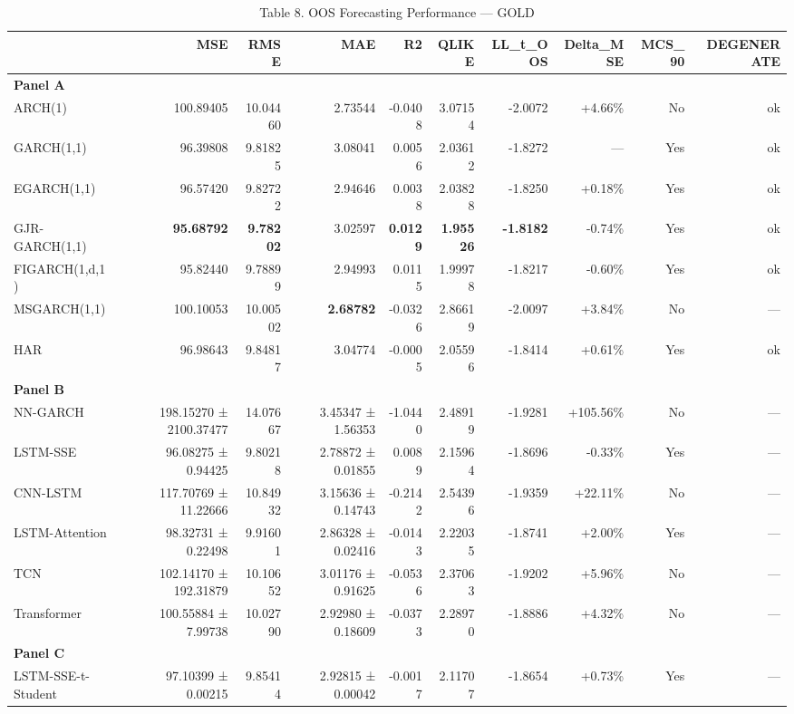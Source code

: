 \begin{table}[ht]
\centering
\caption{Table 8. OOS Forecasting Performance — GOLD}
\label{tab:oos_gold}
\begin{tabular}{lrrrrrrrrr}
\toprule
 & MSE & RMSE & MAE & R2 & QLIKE & LL_t_OOS & Delta_MSE & MCS_90 & DEGENERATE \\
\midrule
\multicolumn{10}{l}{\textbf{Panel A}} \\
ARCH(1) & 100.89405 & 10.04460 & 2.73544 & -0.0408 & 3.07154 & -2.0072 & +4.66\% & No & ok \\
GARCH(1,1) & 96.39808 & 9.81825 & 3.08041 & 0.0056 & 2.03612 & -1.8272 & — & Yes & ok \\
EGARCH(1,1) & 96.57420 & 9.82722 & 2.94646 & 0.0038 & 2.03828 & -1.8250 & +0.18\% & Yes & ok \\
GJR-GARCH(1,1) & \textbf{95.68792} & \textbf{9.78202} & 3.02597 & \textbf{0.0129} & \textbf{1.95526} & \textbf{-1.8182} & -0.74\% & Yes & ok \\
FIGARCH(1,d,1) & 95.82440 & 9.78899 & 2.94993 & 0.0115 & 1.99978 & -1.8217 & -0.60\% & Yes & ok \\
MSGARCH(1,1) & 100.10053 & 10.00502 & \textbf{2.68782} & -0.0326 & 2.86619 & -2.0097 & +3.84\% & No & — \\
HAR & 96.98643 & 9.84817 & 3.04774 & -0.0005 & 2.05596 & -1.8414 & +0.61\% & Yes & ok \\
\multicolumn{10}{l}{\textbf{Panel B}} \\
NN-GARCH & 198.15270 ± 2100.37477 & 14.07667 & 3.45347 ± 1.56353 & -1.0440 & 2.48919 & -1.9281 & +105.56\% & No & — \\
LSTM-SSE & 96.08275 ± 0.94425 & 9.80218 & 2.78872 ± 0.01855 & 0.0089 & 2.15964 & -1.8696 & -0.33\% & Yes & — \\
CNN-LSTM & 117.70769 ± 11.22666 & 10.84932 & 3.15636 ± 0.14743 & -0.2142 & 2.54396 & -1.9359 & +22.11\% & No & — \\
LSTM-Attention & 98.32731 ± 0.22498 & 9.91601 & 2.86328 ± 0.02416 & -0.0143 & 2.22035 & -1.8741 & +2.00\% & Yes & — \\
TCN & 102.14170 ± 192.31879 & 10.10652 & 3.01176 ± 0.91625 & -0.0536 & 2.37063 & -1.9202 & +5.96\% & No & — \\
Transformer & 100.55884 ± 7.99738 & 10.02790 & 2.92980 ± 0.18609 & -0.0373 & 2.28970 & -1.8886 & +4.32\% & No & — \\
\multicolumn{10}{l}{\textbf{Panel C}} \\
LSTM-SSE-t-Student & 97.10399 ± 0.00215 & 9.85414 & 2.92815 ± 0.00042 & -0.0017 & 2.11707 & -1.8654 & +0.73\% & Yes & — \\

\end{tabular}
\end{table}
